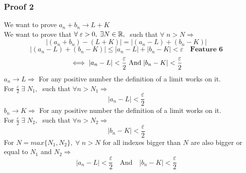 \subsubsection{Proof 2}
We want to prove $a_n+b_n\rightarrow L+K$\\
We want to prove that $\forall\; \varepsilon>0,\; \exists N\in \mathbb{R},\;$ such that $\forall\; n>N\Longrightarrow$
\[
    |(a_n+b_n)-(L+K)|=|(a_n-L)+(b_n-K)|
\]
\[
    |(a_n-L)+(b_n-K)|\leq |a_n-L|+|b_n-K|<\varepsilon \quad \textbf{Feature 6}
\]
\[
    \iff |a_n-L|<\frac{\varepsilon}{2}\; \text{And\;} |b_n-K|<\frac{\varepsilon}{2}
\]
$a_n\rightarrow L\Longrightarrow$ For any positive number the definition of a limit works on it.\\
For $\frac{\varepsilon}{2}\; \exists\; N_1,\;$ such that $\forall n>N_1 \Longrightarrow$
\[
    |a_n-L|<\frac{\varepsilon}{2}
\]
$b_n\rightarrow K\Longrightarrow$ For any positive number the definition of a limit works on it.\\
For $\frac{\varepsilon}{2}\; \exists\; N_2,\;$ such that $\forall n>N_2 \Longrightarrow$
\[
    |b_n-K|<\frac{\varepsilon}{2}
\]
For $N=max\{N_1,N_2\},\;\forall\; n>N$ for all indexes bigger than $N$ are also bigger or equal to $N_1$ and $N_2\Longrightarrow$
\[
    |a_n-L|<\frac{\varepsilon}{2} \quad \text{And} \quad |b_n-K|<\frac{\varepsilon}{2}
\]


